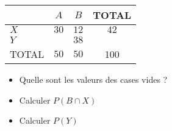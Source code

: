 \documentclass{automatisme}
\begin{document}
\begin{frame}
	\renewcommand{\arraystretch}{1.3}
	\begin{center}
		\begin{tabular}{|l|c|c|c|}
			\hline
			      & $A$               & $B$  & TOTAL             \\ \hline
			$X$   & $30$              & $12$ & $42$              \\ \hline
			$Y$   & $\correction{20}$ & $38$ & $\correction{58}$ \\ \hline
			TOTAL & $50$              & $50$ & 100               \\ \hline
		\end{tabular}
	\end{center}

	\begin{itemize}
		\item Quelle sont les valeurs des cases vides ?
		\item Calculer $P(B ∩ X)$
		\item Calculer $P(Y)$
	\end{itemize}
\end{frame}
\end{document}
